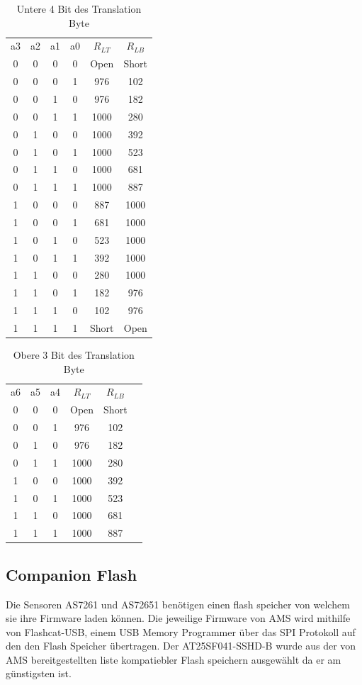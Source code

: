 \begin{table}[!ht]
\caption{Untere 4 Bit des Translation Byte}
\label{TranslationByte_Lower}
\centering
\begin{tabular}{c|c|c|c|c|c}
 a3 & a2 & a1 & a0 & $R_{LT}$ & $R_{LB}$\\
 0 & 0 & 0 & 0 & Open & Short \\ 
 0 & 0 & 0 & 1 & 976 & 102\\ 
 0 & 0 & 1 & 0 & 976 & 182\\
 0 & 0 & 1 & 1 & 1000 & 280\\ 
 0 & 1 & 0 & 0 & 1000 & 392\\ 
 0 & 1 & 0 & 1 & 1000 & 523\\ 
 0 & 1 & 1 & 0 & 1000 & 681\\ 
 0 & 1 & 1 & 1 & 1000 & 887\\
 1 & 0 & 0 & 0 & 887 & 1000 \\ 
 1 & 0 & 0 & 1 & 681 & 1000\\ 
 1 & 0 & 1 & 0 & 523 & 1000\\
 1 & 0 & 1 & 1 & 392 & 1000\\ 
 1 & 1 & 0 & 0 & 280 & 1000\\ 
 1 & 1 & 0 & 1 & 182 & 976 \\ 
 1 & 1 & 1 & 0 & 102 & 976\\ 
 1 & 1 & 1 & 1 & Short & Open\\
\end{tabular}
\end{table}

\begin{table}[!ht]
\caption{Obere 3 Bit des Translation Byte}
\label{TranslationByte_Upper}
\centering
\begin{tabular}{c|c|c|c|c|c}
 a6 & a5 & a4 & $R_{LT}$ & $R_{LB}$\\
 0 & 0 & 0 & Open & Short \\ 
 0 & 0 & 1 & 976 & 102\\ 
 0 & 1 & 0 & 976 & 182\\
 0 & 1 & 1 & 1000 & 280\\ 
 1 & 0 & 0 & 1000 & 392\\ 
 1 & 0 & 1 & 1000 & 523\\ 
 1 & 1 & 0 & 1000 & 681\\ 
 1 & 1 & 1 & 1000 & 887\\

\end{tabular}
\end{table}

\subsection{Companion Flash}
Die Sensoren AS7261 und AS72651 benötigen einen flash speicher von welchem sie ihre Firmware laden können.
Die jeweilige Firmware von AMS wird mithilfe von Flashcat-USB, einem USB Memory Programmer über das SPI Protokoll auf den den Flash Speicher übertragen.
Der AT25SF041-SSHD-B wurde aus der von AMS bereitgestellten liste kompatiebler Flash speichern ausgewählt da er am günstigsten ist. 



